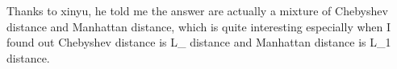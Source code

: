 \documentclass[12pt]{article}
\begin{document}
\begin{center}
\end{center}

Thanks to xinyu, he told me the answer are actually a mixture of Chebyshev distance and Manhattan distance, which is quite interesting especially when I found out Chebyshev distance is L_{\infty} distance and Manhattan distance is L_{1} distance.
\end{document}
